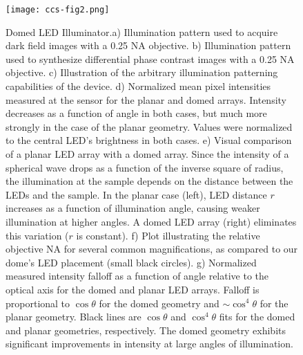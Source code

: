 {{%
\begin{figure} [h]
\begin{center}
\texttt{[image: ccs-fig2.png]}
\end{center}
\caption {{ Domed LED Illuminator.}{a)} Illumination pattern used to acquire dark field images with a 0.25 NA objective.
{b)} Illumination pattern used to synthesize differential phase contrast images with a 0.25 NA objective.
{c)} Illustration of the arbitrary illumination patterning capabilities of the device.
{d)} Normalized mean pixel intensities measured at the sensor for the planar and domed arrays. Intensity decreases as a function of angle in both cases, but much more strongly in the case of the planar geometry. Values were normalized to the central LED's brightness in both cases.
{e)} Visual comparison of a planar LED array with a domed array. Since the intensity of a spherical wave drops as a function of the inverse square of radius, the illumination at the sample depends on the distance between the LEDs and the sample. In the planar case (left), LED distance $r$ increases as a function of illumination angle, causing weaker illumination at higher angles. A domed LED array (right) eliminates this variation ($r$ is constant).
{f)} Plot illustrating the relative objective NA for several common magnifications, as compared to our dome's LED placement (small black circles).
{g)} Normalized measured intensity falloff as a function of angle relative to the optical axis for the domed and planar LED arrays. Falloff is proportional to $\cos{\theta}$ for the domed geometry and $\sim\cos^4{\theta}$ for the planar geometry. Black lines are $\cos{\theta}$ and $\cos^4{\theta}$ fits for the domed and planar geometries, respectively. The domed geometry exhibits significant improvements in intensity at large angles of illumination.
}
\label{fig:dome}
\end{figure}

}}
